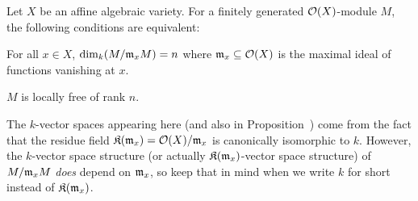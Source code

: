 \documentclass[a4paper,parskip=half,numbers=enddot, DIV=12]{scrreprt}
\begin{document}
\begin{prop}
    Let $X$ be an affine algebraic variety. For a finitely generated $\mathcal{O}(X)$-module $M$, the following conditions are equivalent:
    \begin{alphanumerate}
        \item 
            For all $x\in X$, $\dim_k(M/\mathfrak{m}_x M)=n$ where $\mathfrak{m}_x\subseteq\mathcal{O}(X)$ is the maximal ideal of functions vanishing at $x$.
        \item 
            $M$ is locally free of rank $n$.
    \end{alphanumerate}
\end{prop}
\begin{rem*}
	The $k$-vector spaces appearing here (and also in Proposition~) come from the fact that the residue field $\mathfrak{K}(\mathfrak{m}_x)=\mathcal{O}(X)/\mathfrak{m}_x$ is canonically isomorphic to $k$. However, the $k$-vector space structure (or actually $\mathfrak{K}(\mathfrak{m}_x)$-vector space structure) of $M/\mathfrak{m}_xM$ \emph{does} depend on $\mathfrak{m}_x$, so keep that in mind when we write $k$ for short instead of $\mathfrak{K}(\mathfrak{m}_x)$.
\end{rem*}
\end{document}
